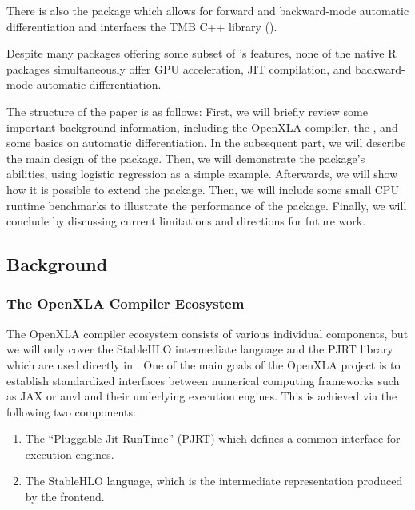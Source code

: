 There is also the  package which allows for forward and backward-mode automatic differentiation and interfaces the TMB C++ library (\citep{ref-tmb}).

Despite many packages offering some subset of 's features, none of the native R packages simultaneously offer GPU acceleration, JIT compilation, and backward-mode automatic differentiation.

The structure of the paper is as follows:
First, we will briefly review some important background information, including the OpenXLA compiler, the , and some basics on automatic differentiation.
In the subsequent part, we will describe the main design of the  package.
Then, we will demonstrate the package's abilities, using logistic regression as a simple example.
Afterwards, we will show how it is possible to extend the package.
Then, we will include some small CPU runtime benchmarks to illustrate the performance of the package.
Finally, we will conclude by discussing current limitations and directions for future work.

\subsection{Background}\label{background}

\subsubsection{The OpenXLA Compiler Ecosystem}\label{the-openxla-compiler-ecosystem}

The OpenXLA compiler ecosystem consists of various individual components, but we will only cover the StableHLO intermediate language and the PJRT library which are used directly in .
One of the main goals of the OpenXLA project is to establish standardized interfaces between numerical computing frameworks such as JAX or anvl and their underlying execution engines.
This is achieved via the following two components:

\begin{enumerate}
\def\labelenumi{\arabic{enumi}.}
\tightlist
\item
  The ``Pluggable Jit RunTime'' (PJRT) which defines a common interface for execution engines.
\item
  The StableHLO language, which is the intermediate representation produced by the frontend.
\end{enumerate}

